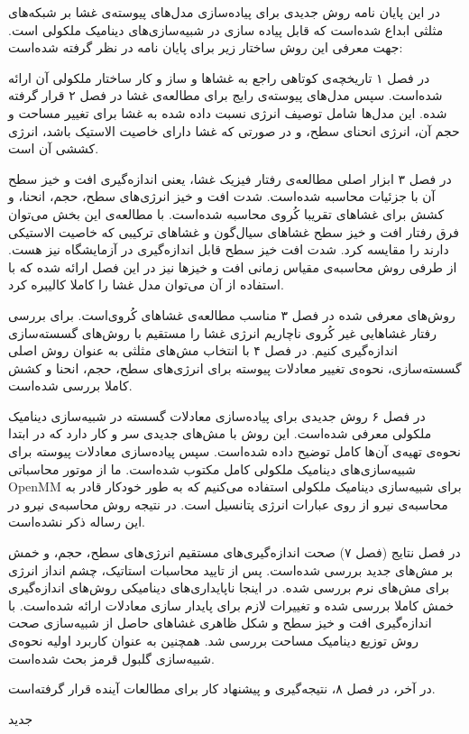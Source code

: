 



در این پایان نامه روش جدیدی برای پیاده‌سازی مدل‌های پیوسته‌ی غشا بر شبکه‌های مثلثی ابداع شده‌است که قابل پیاده سازی در شبیه‌سازی‌های دینامیک ملکولی است. جهت معرفی این روش ساختار زیر برای پایان نامه در نظر گرفته شده‌است:

در فصل ۱ تاریخچه‌ی کوتاهی راجع به غشا‌ها و ساز و کار ساختار ملکولی آن  ارائه شده‌است. سپس مدل‌های پیوسته‌ی رایج برای مطالعه‌ی غشا در فصل ۲ قرار گرفته شده. این مدل‌ها شامل توصیف انرژی نسبت داده شده به غشا برای تغییر مساحت و حجم آن، انرژی انحنای سطح، و در صورتی که غشا دارای خاصیت الاستیک باشد، انرژی کششی آن است.

در فصل ۳ ابزار اصلی مطالعه‌ی رفتار فیزیک غشا، یعنی اندازه‌گیری افت و خیز سطح آن با جزئیات محاسبه  شده‌است.  شدت افت و خیز انرژی‌های سطح، حجم، انحنا، و کشش برای غشا‌های تقریبا کُروی  محاسبه شده‌است. با مطالعه‌ی این بخش می‌توان فرق رفتار افت و خیز سطح غشا‌های سیال‌گون و غشا‌های ترکیبی که خاصیت الاستیکی دارند را مقایسه‌ کرد. شدت‌ افت خیز سطح قابل اندازه‌گیری در آزمایشگاه نیز هست. از طرفی روش محاسبه‌ی مقیاس زمانی افت و خیز‌ها نیز در این فصل ارائه شده که با استفاده از آن می‌توان مدل‌ غشا را کاملا کالیبره کرد.

روش‌های معرفی شده در فصل ۳ مناسب مطالعه‌ی غشا‌های کُروی‌است. برای بررسی رفتار غشا‌هایی غیر کُروی ناچاریم انرژی‌ غشا را مستقیم با روش‌های گسسته‌سازی اندازه‌گیری کنیم. در فصل ۴ با انتخاب مش‌های مثلثی به عنوان روش اصلی گسسته‌سازی، نحوه‌ی تغییر معادلات پیوسته برای انرژی‌های سطح، حجم، انحنا و کشش کاملا بررسی شده‌است.

در فصل ۶ روش جدیدی برای پیاده‌سازی معادلات گسسته در شبیه‌سازی دینامیک ملکولی معرفی شده‌است. این روش با مش‌های جدیدی سر و کار دارد که در ابتدا نحوه‌ی تهیه‌ی آن‌ها کامل توضیح داده شده‌است. سپس پیاده‌سازی معادلات پیوسته برای شبیه‌سازی‌های دینامیک ملکولی کامل مکتوب شده‌است. ما از موتور محاسباتی 
OpenMM
برای شبیه‌سازی دینامیک ملکولی استفاده می‌کنیم که به طور خودکار قادر به محاسبه‌ی نیرو از روی  عبارات انرژی پتانسیل است. در نتیجه روش محاسبه‌ی نیرو در این رساله ذکر نشده‌است.

در فصل نتایج (فصل ۷) صحت اندازه‌گیری‌های مستقیم انرژی‌های سطح، حجم، و خمش بر مش‌های جدید بررسی شده‌است. پس از تایید محاسبات استاتیک، چشم انداز انرژی برای  مش‌های نرم بررسی شده. در اینجا ناپایداری‌های دینامیکی روش‌های اندازه‌گیری خمش کاملا بررسی شده و تغییرات لازم برای پایدار سازی معادلات ارائه شده‌است. با اندازه‌گیری افت و خیز سطح و شکل‌ ظاهری غشا‌های حاصل از شبیه‌سازی صحت  روش توزیع دینامیک مساحت بررسی شد. همچنین به عنوان کاربرد اولیه‌ نحوه‌ی شبیه‌سازی گلبول قرمز بحث شده‌است.

در آخر، در فصل ۸، نتیجه‌گیری و پیشنهاد کار برای مطالعات آینده قرار گرفته‌است.



‌جدید

